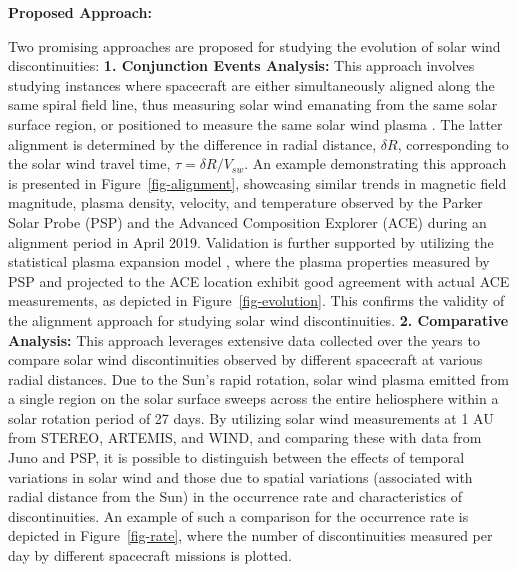 \documentclass[
  letterpaper,
  DIV=11,
  numbers=noendperiod]{scrartcl}
\begin{document}
\textbf{Proposed Approach:}

Two promising approaches are proposed for studying the evolution of solar wind discontinuities:
\textbf{1. Conjunction Events Analysis:} This approach involves studying instances where spacecraft are either simultaneously aligned along the same spiral field line, thus measuring solar wind emanating from the same solar surface region, or positioned to measure the same solar wind plasma \citep{velliUnderstandingOriginsHeliosphere2020}. The latter alignment is determined by the difference in radial distance, \(\delta R\), corresponding to the solar wind travel time, \(\tau = \delta R / V_{sw}\).
An example demonstrating this approach is presented in Figure~\ref{fig-alignment}, showcasing similar trends in magnetic field magnitude, plasma density, velocity, and temperature observed by the Parker Solar Probe (PSP) and the Advanced Composition Explorer (ACE) during an alignment period in April 2019. Validation is further supported by utilizing the statistical plasma expansion model \citep{perroneRadialEvolutionSolar2019}, where the plasma properties measured by PSP and projected to the ACE location exhibit good agreement with actual ACE measurements, as depicted in Figure~\ref{fig-evolution}. This confirms the validity of the alignment approach for studying solar wind discontinuities.
\textbf{2. Comparative Analysis:} This approach leverages extensive data collected over the years to compare solar wind discontinuities observed by different spacecraft at various radial distances. Due to the Sun's rapid rotation, solar wind plasma emitted from a single region on the solar surface sweeps across the entire heliosphere within a solar rotation period of 27 days. By utilizing solar wind measurements at 1 AU from STEREO, ARTEMIS, and WIND, and comparing these with data from Juno and PSP, it is possible to distinguish between the effects of temporal variations in solar wind and those due to spatial variations (associated with radial distance from the Sun) in the occurrence rate and characteristics of discontinuities. An example of such a comparison for the occurrence rate is depicted in Figure~\ref{fig-rate}, where the number of discontinuities measured per day by different spacecraft missions is plotted.
\end{document}
